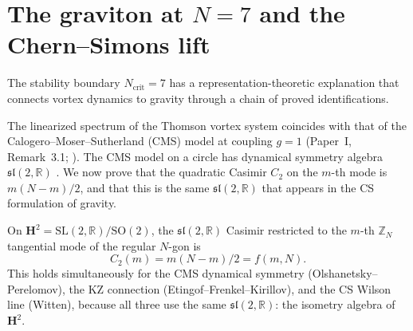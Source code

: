 \section{The graviton at $N = 7$ and the Chern--Simons lift}
\label{sec:graviton}

The stability boundary $N_{\mathrm{crit}} = 7$ has a
representation-theoretic explanation that connects
vortex dynamics to gravity through a chain of
proved identifications.

The linearized spectrum of the Thomson vortex system
coincides with that of the
Calogero--Moser--Sutherland (CMS) model at coupling $g = 1$
(Paper~I, Remark~3.1; \citealt{Calogero1975}).
The CMS model on a circle has dynamical symmetry algebra
$\mathfrak{sl}(2,\mathbb{R})$
\citep{OlshanetskyPerelomov1976}.
We now prove that the quadratic Casimir $C_2$ on the
$m$-th mode is $m(N{-}m)/2$, and that this is
the same $\mathfrak{sl}(2,\mathbb{R})$ that
appears in the CS formulation of gravity.

\begin{proposition}
\label{prop:casimir-havelock}
On $\mathbf{H}^2 = \mathrm{SL}(2,\mathbb{R})/\mathrm{SO}(2)$,
the $\mathfrak{sl}(2,\mathbb{R})$ Casimir restricted to the
$m$-th $\mathbb{Z}_N$ tangential mode of the regular $N$-gon is
\begin{equation}\label{eq:cms-casimir}
  C_2(m) = m(N{-}m)/2 = f(m,N).
\end{equation}
This holds simultaneously for the CMS dynamical symmetry
(Olshanetsky--Perelomov), the KZ connection (Etingof--Frenkel--Kirillov),
and the CS Wilson line (Witten), because all three use the
same $\mathfrak{sl}(2,\mathbb{R})$: the isometry algebra
of~$\mathbf{H}^2$.
\end{proposition}

